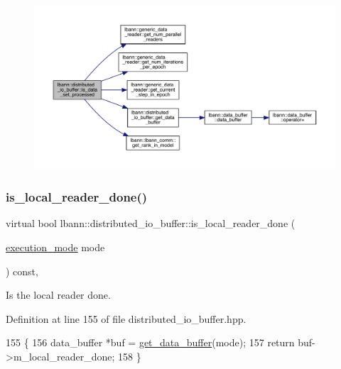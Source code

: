 \begin{figure}[H]
\begin{center}
\leavevmode
\includegraphics[width=350pt]{classlbann_1_1distributed__io__buffer_a2e214f6542d9b12c8a29bf41d0ee220e_cgraph}
\end{center}
\end{figure}
\mbox{\label{classlbann_1_1distributed__io__buffer_a484e3a609b32218890327d7578116aa2}} 
\subsubsection{\texorpdfstring{is\+\_\+local\+\_\+reader\+\_\+done()}{is\_local\_reader\_done()}}
{\footnotesize\ttfamily virtual bool lbann\+::distributed\+\_\+io\+\_\+buffer\+::is\+\_\+local\+\_\+reader\+\_\+done (\begin{DoxyParamCaption}\item[{\hyperlink{base_8hpp_a2781a159088df64ed7d47cc91c4dc0a8}{execution\+\_\+mode}}]{mode }\end{DoxyParamCaption}) const\hspace{0.3cm}{\ttfamily [inline]}, {\ttfamily [virtual]}}



Is the local reader done. 



Definition at line 155 of file distributed\+\_\+io\+\_\+buffer.\+hpp.


\begin{DoxyCode}
155                                                                \{
156     data\_buffer *buf = \hyperlink{classlbann_1_1distributed__io__buffer_ac176f3fced1191534a985f831136aa3e}{get\_data\_buffer}(mode);
157     \textcolor{keywordflow}{return} buf->m\_local\_reader\_done;
158   \}
\end{DoxyCode}
\mbox{\label{classlbann_1_1distributed__io__buffer_a021724e36cc803bb8dabd747d1f49035}} 
